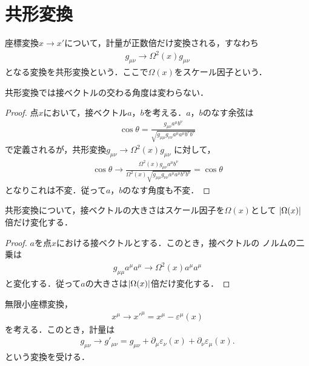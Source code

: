 \section{共形変換}
\begin{defn}[共形変換]
	座標変換\(x\longrightarrow{}x'\)について，計量が正数倍だけ変換される，すなわち
	\begin{align}
		g_{\mu\nu}\longrightarrow{}\Omega^{2}(x)g_{\mu\nu}
	\end{align}
	となる変換を共形変換という．ここで\(\Omega(x)\)をスケール因子という．
\end{defn}
\begin{prop}
	共形変換では接ベクトルの交わる角度は変わらない．
\end{prop}
\begin{proof}
	点\(x\)において，接ベクトル\(a\)，\(b\)を考える．\(a\)，\(b\)のなす余弦は
	\begin{align}
		\cos\theta=\frac{g_{\mu\nu}a^{\mu}b^{\nu}}{\sqrt{g_{\mu\mu}g_{\nu\nu}a^{\mu}a^{\mu}b^{\nu}b^{\nu}}}
	\end{align}
	で定義されるが，共形変換\(g_{\mu\nu}\longrightarrow{}\Omega^{2}(x)g_{\mu\nu}\)
	に対して，
	\begin{align}
		\cos\theta\longrightarrow{}\frac{\Omega^{2}(x)g_{\mu\nu}a^{\mu}b^{\nu}}{\Omega^{2}(x)\sqrt{g_{\mu\mu}g_{\nu\nu}a^{\mu}a^{\mu}b^{\nu}b^{\nu}}}=\cos\theta
	\end{align}
	となりこれは不変．従って\(a\)，\(b\)のなす角度も不変．
\end{proof}
\begin{prop}
	共形変換について，接ベクトルの大きさはスケール因子を\(\Omega(x)\)として
	\(\lvert\Omega(x)\rvert\)倍だけ変化する．
\end{prop}
\begin{proof}
	\(a\)を点\(x\)における接ベクトルとする．このとき，接ベクトルの
	ノルムの二乗は
	\begin{align}
		g_{\mu\mu}a^{\mu}a^{\mu}\longrightarrow{}\Omega^{2}(x)a^{\mu}a^{\mu}
	\end{align}
	と変化する．従って\(a\)の大きさは\(\lvert\Omega(x)\rvert\)倍だけ変化する．
\end{proof}
\begin{prop}[無限小座標変換]\label{prop::transformation-rule-for-metric}
	無限小座標変換，
	\begin{align}
		x^{\mu}\longrightarrow{}x'^{\mu}=x^{\mu}-\varepsilon^{\mu}(x)
	\end{align}
	を考える．このとき，計量は
	\begin{align}
		g_{\mu\nu}\longrightarrow{}g'_{\mu\nu}=g_{\mu\nu}+\partial_{\mu}\varepsilon_{\nu}(x)+\partial_{\nu}\varepsilon_{\mu}(x).
	\end{align}
	という変換を受ける．
\end{prop}
